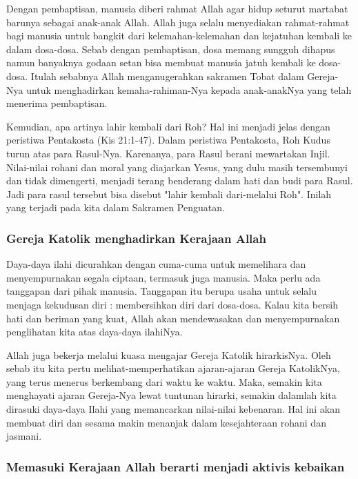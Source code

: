 \documentclass[a5paper,headsepline,titlepage,11pt,nnormalheadings,DIVcalc]{scrbook}
\begin{document}
Dengan pembaptisan, manusia diberi rahmat Allah agar hidup seturut martabat barunya sebagai anak-anak Allah. Allah juga selalu menyediakan rahmat-rahmat bagi manusia untuk bangkit dari kelemahan-kelemahan dan kejatuhan kembali ke dalam dosa-dosa. Sebab dengan pembaptisan, dosa memang sungguh dihapus namun banyaknya godaan setan bisa membuat manusia jatuh kembali ke dosa-dosa. Itulah sebabnya Allah menganugerahkan sakramen Tobat dalam Gereja-Nya untuk menghadirkan kemaha-rahiman-Nya kepada anak-anakNya yang telah menerima pembaptisan.

Kemudian, apa artinya lahir kembali dari Roh? Hal ini menjadi jelas dengan peristiwa Pentakosta (Kis 21:1-47). Dalam peristiwa Pentakosta, Roh Kudus turun atas para Rasul-Nya. Karenanya, para Rasul berani mewartakan Injil. Nilai-nilai rohani dan moral yang diajarkan Yesus, yang dulu masih tersembunyi dan tidak dimengerti, menjadi terang benderang dalam hati dan budi para Rasul. Jadi para rasul tersebut bisa disebut "lahir kembali dari-melalui Roh". Inilah yang terjadi pada kita dalam Sakramen Penguatan.

\subsubsection*{Gereja Katolik menghadirkan Kerajaan Allah}

Daya-daya ilahi dicurahkan dengan cuma-cuma untuk memelihara dan menyempurnakan segala ciptaan, termasuk juga manusia. Maka perlu ada tanggapan dari pihak manusia. Tanggapan itu berupa usaha untuk selalu menjaga kekudusan diri : membersihkan diri dari dosa-dosa. Kalau kita bersih hati dan beriman yang kuat, Allah akan mendewasakan dan menyempurnakan penglihatan kita atas daya-daya ilahiNya.

Allah juga bekerja melalui kuasa mengajar Gereja Katolik hirarkisNya. Oleh sebab itu kita pertu melihat-memperhatikan ajaran-ajaran Gereja KatolikNya, yang terus menerus berkembang dari waktu ke waktu. Maka, semakin kita menghayati ajaran Gereja-Nya lewat tuntunan hirarki, semakin dalamlah kita dirasuki daya-daya Ilahi yang memancarkan nilai-nilai kebenaran. Hal ini akan membuat diri dan sesama makin menanjak dalam kesejahteraan rohani dan jasmani.

 

\subsubsection*{Memasuki Kerajaan Allah berarti menjadi aktivis kebaikan}
\end{document}
